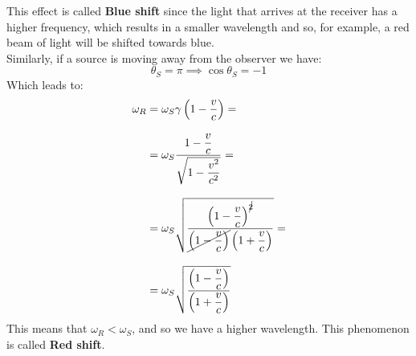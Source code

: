 This effect is called \textbf{Blue shift} since the light that arrives at the receiver has a higher frequency, which results in a smaller wavelength and so, for example, a red beam of light will be shifted towards blue.\\
Similarly, if a source is moving away from the observer we have:
\begin{equation}
  \theta_S = \pi \implies \cos \theta_S = -1
\end{equation}
Which leads to:
\begin{equation}
  \begin{split}
    \omega_R  &= \omega_S \gamma\left(1 - \dfrac{v}{c}\right) = \\[8pt]
    &= \omega_S \dfrac{1 - \dfrac{v}{c}}{\sqrt{1 - \dfrac{v^2}{c^2}}} = \\[8pt]
    &= \omega_S \sqrt{\dfrac{\left(1 - \dfrac{v}{c}\right)^{\cancel{2}}}{\cancel{\left(1 - \dfrac{v}{c}\right)}\left(1 + \dfrac{v}{c}\right)}} = \\[8pt]
    &= \omega_S \sqrt{\dfrac{\left(1 - \dfrac{v}{c}\right)}{\left(1 + \dfrac{v}{c}\right)}}
  \end{split}
\end{equation}
This means that $\omega_R < \omega_S$, and so we have a higher wavelength. This phenomenon is called \textbf{Red shift}.
